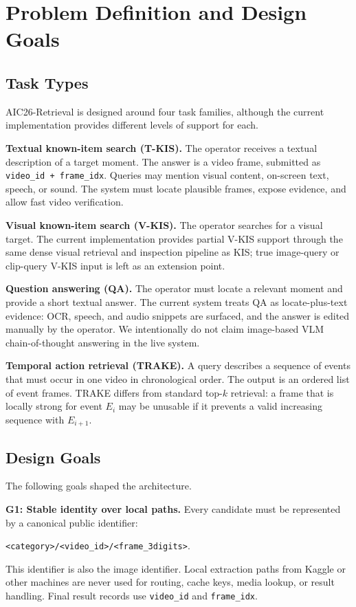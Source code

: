 \documentclass[conference]{IEEEtran}
\newcommand{\sys}{AIC26-Retrieval}
\newcommand{\vid}{\texttt{video\_id}}
\newcommand{\fid}{\texttt{frame\_idx}}
\newcommand{\submitpair}{\texttt{video\_id + frame\_idx}}
\begin{document}
\section{Problem Definition and Design Goals}

\subsection{Task Types}

\sys{} is designed around four task families, although the current
implementation provides different levels of support for each.

\textbf{Textual known-item search (T-KIS).} The operator receives a textual
description of a target moment. The answer is a video frame, submitted as
\submitpair{}. Queries may mention visual content, on-screen text, speech, or
sound. The system must locate plausible frames, expose evidence, and allow fast
video verification.

\textbf{Visual known-item search (V-KIS).} The operator searches for a visual
target. The current implementation provides partial V-KIS support through the
same dense visual retrieval and inspection pipeline as KIS; true image-query or
clip-query V-KIS input is left as an extension point.

\textbf{Question answering (QA).} The operator must locate a relevant moment and
provide a short textual answer. The current system treats QA as locate-plus-text
evidence: OCR, speech, and audio snippets are surfaced, and the answer is
edited manually by the operator. We intentionally do not claim image-based VLM
chain-of-thought answering in the live system.

\textbf{Temporal action retrieval (TRAKE).} A query describes a sequence of
events that must occur in one video in chronological order. The output is an
ordered list of event frames. TRAKE differs from standard top-$k$ retrieval: a
frame that is locally strong for event $E_i$ may be unusable if it prevents a
valid increasing sequence with $E_{i+1}$.

\subsection{Design Goals}

The following goals shaped the architecture.

\textbf{G1: Stable identity over local paths.} Every candidate must be
represented by a canonical public identifier:
\begin{center}
\footnotesize\texttt{<category>/<video\_id>/<frame\_3digits>}.
\end{center}
This identifier is also the image identifier. Local extraction paths from
Kaggle or other machines are never used for routing, cache keys, media lookup,
or result handling. Final result records use \vid{} and \fid{}.
\end{document}
